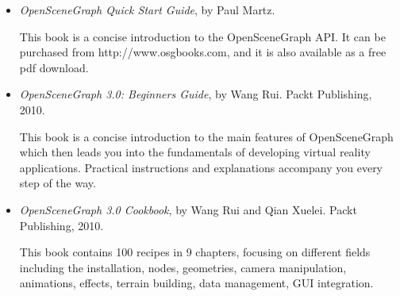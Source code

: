 \begin{itemize}
\item \textit{OpenSceneGraph Quick Start Guide}, by Paul Martz.

This book is a concise introduction to the OpenSceneGraph API. It can be
purchased from http://www.osgbooks.com, and it is also available as
a free pdf download.

\item \textit{OpenSceneGraph 3.0: Beginners Guide}, by Wang Rui. Packt Publishing, 2010.

This book is a concise introduction to the main features of OpenSceneGraph
which then leads you into the fundamentals of developing virtual reality
applications. Practical instructions and explanations accompany you every
step of the way.

\item \textit{OpenSceneGraph 3.0 Cookbook}, by Wang Rui and Qian Xuelei. Packt Publishing, 2010.

This book contains 100 recipes in 9 chapters, focusing on different
fields including the installation, nodes, geometries, camera manipulation,
animations, effects, terrain building, data management, GUI integration.

\end{itemize}



